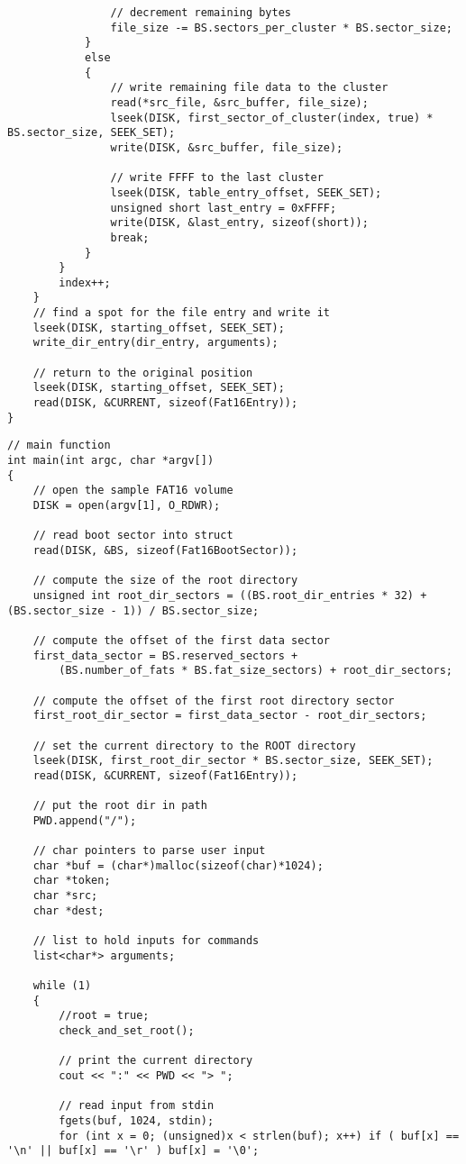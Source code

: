 \documentclass[12pt,letter,titlepage]{article}
\begin{document}
{{\begin{verbatim}
				// decrement remaining bytes
				file_size -= BS.sectors_per_cluster * BS.sector_size;
			}
			else
			{
				// write remaining file data to the cluster
				read(*src_file, &src_buffer, file_size);
				lseek(DISK, first_sector_of_cluster(index, true) * BS.sector_size, SEEK_SET);
				write(DISK, &src_buffer, file_size);

				// write FFFF to the last cluster
				lseek(DISK, table_entry_offset, SEEK_SET);
				unsigned short last_entry = 0xFFFF;
				write(DISK, &last_entry, sizeof(short));
				break;
			}
		}
		index++;
	} 
	// find a spot for the file entry and write it
	lseek(DISK, starting_offset, SEEK_SET);
	write_dir_entry(dir_entry, arguments);

	// return to the original position
	lseek(DISK, starting_offset, SEEK_SET);
	read(DISK, &CURRENT, sizeof(Fat16Entry));
}
\end{verbatim}
\pagebreak
\begin{verbatim}
// main function
int main(int argc, char *argv[])
{
	// open the sample FAT16 volume
	DISK = open(argv[1], O_RDWR);

	// read boot sector into struct
	read(DISK, &BS, sizeof(Fat16BootSector));

	// compute the size of the root directory
	unsigned int root_dir_sectors = ((BS.root_dir_entries * 32) + (BS.sector_size - 1)) / BS.sector_size;

	// compute the offset of the first data sector
	first_data_sector = BS.reserved_sectors + 
		(BS.number_of_fats * BS.fat_size_sectors) + root_dir_sectors;

	// compute the offset of the first root directory sector
	first_root_dir_sector = first_data_sector - root_dir_sectors;

	// set the current directory to the ROOT directory
	lseek(DISK, first_root_dir_sector * BS.sector_size, SEEK_SET);
	read(DISK, &CURRENT, sizeof(Fat16Entry));

	// put the root dir in path
	PWD.append("/");

	// char pointers to parse user input
	char *buf = (char*)malloc(sizeof(char)*1024);
	char *token;
	char *src;
	char *dest;

	// list to hold inputs for commands
	list<char*> arguments;

	while (1)
	{
		//root = true;
		check_and_set_root();

		// print the current directory
		cout << ":" << PWD << "> ";

		// read input from stdin
		fgets(buf, 1024, stdin);
		for (int x = 0; (unsigned)x < strlen(buf); x++) if ( buf[x] == '\n' || buf[x] == '\r' ) buf[x] = '\0';


\end{verbatim}}}
\end{document}
